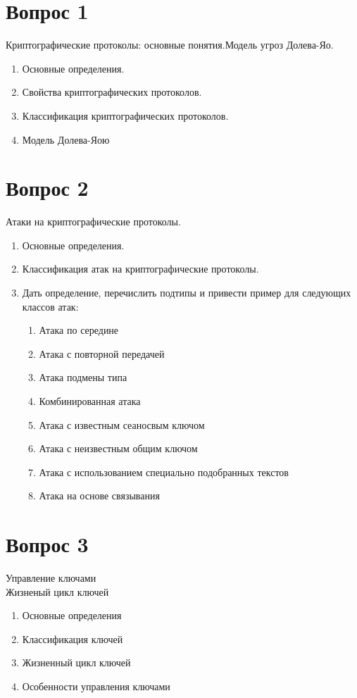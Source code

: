 \documentclass[a4paper,12pt]{article}
\author{Деркач Максим Юрьевич}
\begin{document}
	
	\section{Вопрос 1}
	Криптографические протоколы: основные понятия.Модель угроз Долева-Яо.
	\begin{enumerate}
		\item Основные определения.
		\item Свойства криптографических протоколов.
		\item Классификация криптографических  протоколов.
		\item Модель Долева-Яою
	\end{enumerate}
	\newpage
	
	\section{Вопрос 2}
	Атаки на криптографические протоколы.
	\begin{enumerate}
		\item Основные определения.
			\item Классификация атак на криптографические  протоколы.
		\item Дать определение, перечислить подтипы и привести пример для следующих классов атак:
		\begin{enumerate}
			\item Атака по середине
			\item Атака с повторной передачей
			\item Атака подмены типа
			\item Комбинированная атака
			\item Атака с известным сеаносвым ключом
			\item Атака с неизвестным общим ключом
			\item Атака с использованием специально подобранных текстов
			\item Атака на основе связывания
			
		\end{enumerate}	
	\end{enumerate}
	\newpage
	
	\section{Вопрос 3}
	Управление ключами \\ Жизненый цикл ключей
	\begin{enumerate}
		\item Основные определения
		\item Классификация ключей
		\item Жизненный цикл ключей
		\item Особенности управления ключами
	\end{enumerate}
	\newpage
	
\end{document}
